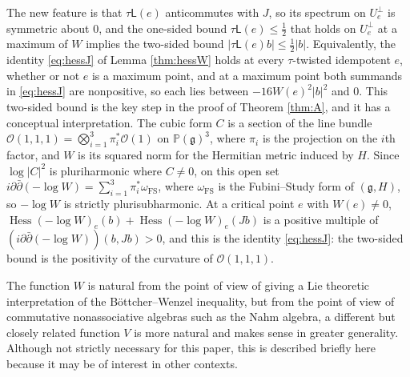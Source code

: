 \documentclass[leqno,10pt]{amsart}
\theoremstyle{definition}
\numberwithin{equation}{section}
\newcommand{\hess}{\operatorname{Hess}}
\newcommand{\lin}{\mathsf{L}}
\newcommand{\proj}{\mathbb{P}}
\newcommand{\g}{\mathfrak{g}}
\newcommand{\nnorm}[1]{\lvert #1\rvert}%
\newcommand{\Usp}{U}
\newcommand{\Uperp}{\Usp^{\perp}}
\begin{document}
The new feature is that $\tau\lin(e)$ anticommutes with $J$, so its spectrum on $\Uperp_{e}$ is symmetric about $0$, and the one-sided bound $\tau\lin(e) \leq \tfrac{1}{2}$ that holds on $\Uperp_{e}$ at a maximum of $W$ implies the two-sided bound $\nnorm{\tau\lin(e)b} \leq \tfrac{1}{2}\nnorm{b}$. Equivalently, the identity \eqref{eq:hessJ} of Lemma \ref{thm:hessW} holds at every $\tau$-twisted idempotent $e$, whether or not $e$ is a maximum point, and at a maximum point both summands in \eqref{eq:hessJ} are nonpositive, so each lies between $-16W(e)^{2}\nnorm{b}^{2}$ and $0$. This two-sided bound is the key step in the proof of Theorem \ref{thm:A}, and it has a conceptual interpretation. The cubic form $C$ is a section of the line bundle $\mathcal{O}(1, 1, 1) = \bigotimes_{i=1}^{3}\pi_{i}^{\ast}\mathcal{O}(1)$ on $\proj(\g)^{3}$, where $\pi_{i}$ is the projection on the $i$th factor, and $W$ is its squared norm for the Hermitian metric induced by $H$. Since $\log|C|^{2}$ is pluriharmonic where $C \neq 0$, on this open set $i\partial\bar\partial(-\log W) = \sum_{i=1}^{3}\pi_{i}^{\ast}\omega_{\mathrm{FS}}$, where $\omega_{\mathrm{FS}}$ is the Fubini--Study form of $(\g, H)$, so $-\log W$ is strictly plurisubharmonic. At a critical point $e$ with $W(e) \neq 0$, $\hess(-\log W)_{e}(b) + \hess(-\log W)_{e}(Jb)$ is a positive multiple of $(i\partial\bar\partial(-\log W))(b, Jb) > 0$, and this is the identity \eqref{eq:hessJ}: the two-sided bound is the positivity of the curvature of $\mathcal{O}(1, 1, 1)$.

The function $W$ is natural from the point of view of giving a Lie theoretic interpretation of the Böttcher--Wenzel inequality, but from the point of view of commutative nonassociative algebras such as the Nahm algebra, a different but closely related function $V$ is more natural and makes sense in greater generality. Although not strictly necessary for this paper, this is described briefly here because it may be of interest in other contexts.
\end{document}

